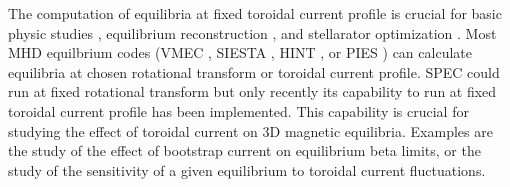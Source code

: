 

%
%
%

The computation of equilibria at fixed toroidal current profile is crucial for basic physic studies \citep{Loizu2017,Suzuki2020}, equilibrium reconstruction \citep{Lao1985,Hanson2009}, and stellarator optimization \citep{Geiger2010,Geiger2015}.  Most \ac{MHD} equilbrium codes (VMEC \citep{Hirshman1983,Hirshman1986}, SIESTA \citep{Hirshman2008,Peraza-Rodriguez2017}, HINT \citep{Harafuji1989,Suzuki2006}, or PIES \citep{Reiman1986,Drevlak2005}) can calculate equilibria at chosen rotational transform or toroidal current profile. \ac{SPEC} could run at fixed rotational transform but only recently its capability to run at fixed toroidal current profile has been implemented. This capability is crucial for studying the effect of toroidal current on 3D magnetic equilibria. Examples are the study of the effect of bootstrap current on equilibrium beta limits, or the study of the sensitivity of a given equilibrium to toroidal current fluctuations.

